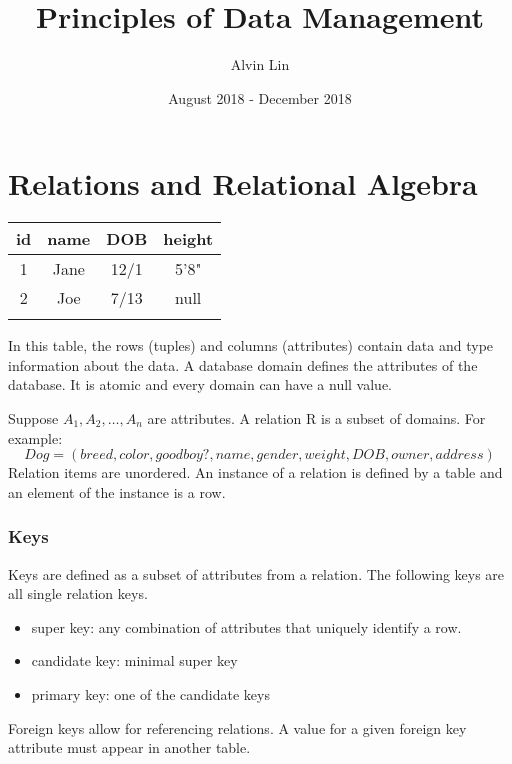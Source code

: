 \documentclass{math}
\title{Principles of Data Management}
\author{Alvin Lin}
\date{August 2018 - December 2018}
\begin{document}
\maketitle

\section*{Relations and Relational Algebra}
\begin{center}
  \begin{tabular}{|c|c|c|c|}
    \hline
    id & name & DOB & height \\
    \hline
    1 & Jane & 12/1 & 5'8" \\
    \hline
    2 & Joe & 7/13 & null \\
    \hline
    &&& \\
    \hline
  \end{tabular}
\end{center}
In this table, the rows (tuples) and columns (attributes) contain data and
type information about the data. A database domain defines the attributes of the
database. It is atomic and every domain can have a null value. \par
Suppose \( A_1,A_2,\dots,A_n \) are attributes. A relation R is a subset of
domains. For example:
\[ Dog = (breed, color, good boy?, name, gender, weight, DOB, owner, address) \]
Relation items are unordered. An instance of a relation is defined by a table
and an element of the instance is a row.

\subsubsection*{Keys}
Keys are defined as a subset of attributes from a relation. The following keys
are all single relation keys.
\begin{itemize}
  \item super key: any combination of attributes that uniquely identify a row.
  \item candidate key: minimal super key
  \item primary key: one of the candidate keys
\end{itemize}
Foreign keys allow for referencing relations. A value for a given foreign key
attribute must appear in another table.
\end{document}
